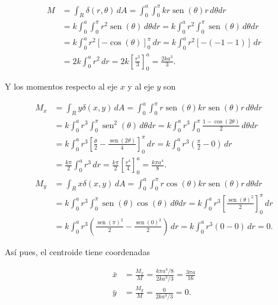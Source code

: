 \documentclass[
  a4paper,
]{scrreport}
\theoremstyle{definition}
\theoremstyle{remark}
\begin{document}
\begin{tcolorbox}
\begin{enumerate}
  \begin{align*}
  M &= \int_R \delta(r,\theta)\, dA 
  = \int_0^a \int_0^\pi kr\operatorname{sen}(\theta) r\, d\theta dr \\
  &= k \int_0^a \int_0^\pi r^2\operatorname{sen}(\theta)\, d\theta dr 
  = k \int_0^a r^2\int_0^\pi \operatorname{sen}(\theta)\, d\theta dr \\ 
  &= k \int_0^a r^2 [-\cos(\theta)]_0^\pi\, dr 
  = k \int_0^a r^2 [-(-1-1)]\, dr \\
  &= 2k \int_0^a r^2\, dr
  = 2k \left[ \frac{r^3}{3} \right]_0^a
  = \frac{2ka^3}{3}.
  \end{align*}

  Y los momentos respecto al eje \(x\) y al eje \(y\) son

  \begin{align*}
  M_x &=
  \int_R y\delta(x,y)\, dA
  = \int_0^a \int_0^\pi r\operatorname{sen}(\theta) kr\operatorname{sen}(\theta)r\, d\theta dr \\
  &= k \int_0^a r^3\int_0^\pi \operatorname{sen}^2(\theta)\, d\theta dr
  = k \int_0^a r^3\int_0^\pi \frac{1-\cos(2\theta)}{2}\, d\theta dr \\
  &= k \int_0^a r^3\left[ \frac{\theta}{2}-\frac{\operatorname{sen}(2\theta)}{4} \right]_0^\pi\, dr 
  = k \int_0^a r^3 \left(\frac{\pi}{2}-0\right)\, dr \\
  &= \frac{k\pi}{2} \int_0^a r^3\, dr
  = \frac{k\pi}{2} \left[ \frac{r^4}{4} \right]_0^a
  = \frac{k\pi a^4}{8}. \\
  M_y &=
  \int_R x\delta(x,y)\, dA
  = \int_0^a \int_0^\pi r\cos(\theta) kr\operatorname{sen}(\theta)r\, d\theta dr \\
  &= k \int_0^a r^3\int_0^\pi \operatorname{sen}(\theta)\cos(\theta)\, d\theta dr
  = k \int_0^a r^3\left[ \frac{\operatorname{sen}(\theta)^2}{2} \right]_0^\pi\, dr \\
  &= k \int_0^a r^3\left(\frac{\operatorname{sen}(\pi)^2}{2} - \frac{\operatorname{sen}(0)^2}{2}\right) \, dr 
  = k \int_0^a r^3 (0 - 0) \, dr
  = 0.
  \end{align*}

  Así pues, el centroide tiene coordenadas

  \begin{align*}
  \bar{x} &= \frac{M_x}{M} = \frac{k\pi a^4/8}{2ka^3/3} = \frac{3\pi a}{16} \\
  \bar{y} &= \frac{M_y}{M} = \frac{0}{2ka^3/3} = 0.
  \end{align*}
\end{enumerate}

\end{tcolorbox}
\end{document}
